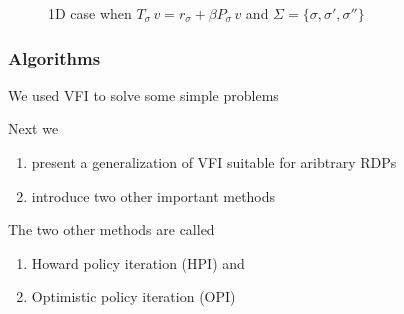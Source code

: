\begin{frame}
    
    \begin{figure}
        \centering
        \caption{1D case when $T_\sigma \, v = r_\sigma + \beta P_\sigma \, v$ and $\Sigma = \{\sigma, \sigma', \sigma''\}$}
    \end{figure}



\end{frame}


\begin{frame}
    \frametitle{Algorithms}

    We used VFI to solve some simple problems

    \vspace{0.5em}
    \vspace{0.5em}
    Next we
    \begin{enumerate}
        \item present a generalization of VFI suitable for aribtrary RDPs
    \vspace{0.5em}
        \item introduce two other important methods
    \end{enumerate}

    \vspace{0.5em}
    The two other methods are called
    \begin{enumerate}
        \item Howard policy iteration (HPI) and
    \vspace{0.5em}
        \item Optimistic policy iteration (OPI)
    \end{enumerate}


\end{frame}


